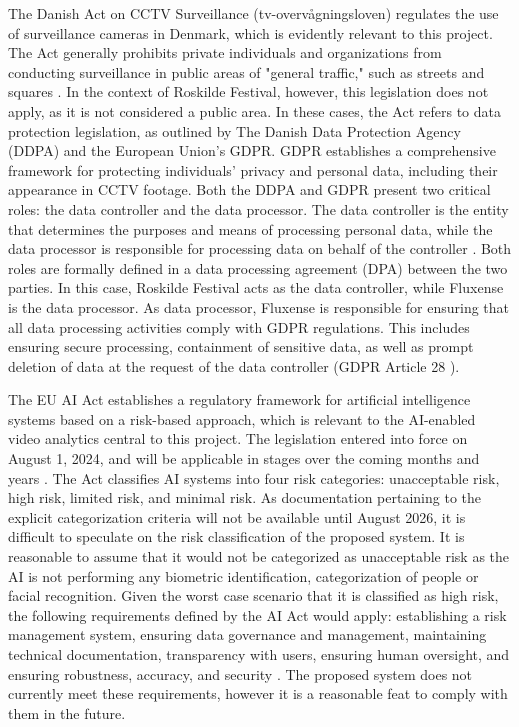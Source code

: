 The Danish Act on CCTV Surveillance (tv-overvågningsloven) regulates the use of surveillance cameras in Denmark, which is evidently relevant to this project. The Act generally prohibits private individuals and organizations from conducting surveillance in public areas of "general traffic," such as streets and squares \cite{cctv_law}. In the context of Roskilde Festival, however, this legislation does not apply, as it is not considered a public area. In these cases, the Act refers to data protection legislation, as outlined by The Danish Data Protection Agency (DDPA) and the European Union's GDPR. GDPR establishes a comprehensive framework for protecting individuals' privacy and personal data, including their appearance in CCTV footage. Both the DDPA and GDPR present two critical roles: the data controller and the data processor. The data controller is the entity that determines the purposes and means of processing personal data, while the data processor is responsible for processing data on behalf of the controller \cite{gdpr_dpa}. Both roles are formally defined in a data processing agreement (DPA) between the two parties. In this case, Roskilde Festival acts as the data controller, while Fluxense is the data processor. As data processor, Fluxense is responsible for ensuring that all data processing activities comply with GDPR regulations. This includes ensuring secure processing, containment of sensitive data, as well as prompt deletion of data at the request of the data controller (GDPR Article 28 \cite{gdpr_article_28}).

The EU AI Act establishes a regulatory framework for artificial intelligence systems based on a risk-based approach, which is relevant to the AI-enabled video analytics central to this project. The legislation entered into force on August 1, 2024, and will be applicable in stages over the coming months and years \cite{ai_act_passed}. The Act classifies AI systems into four risk categories: unacceptable risk, high risk, limited risk, and minimal risk. As documentation pertaining to the explicit categorization criteria will not be available until August 2026, it is difficult to speculate on the risk classification of the proposed system. It is reasonable to assume that it would not be categorized as unacceptable risk as the AI is not performing any biometric identification, categorization of people or facial recognition. Given the worst case scenario that it is classified as high risk, the following requirements defined by the AI Act would apply: establishing a risk management system, ensuring data governance and management, maintaining technical documentation, transparency with users, ensuring human oversight, and ensuring robustness, accuracy, and security \cite{ai_act_requirements}. The proposed system does not currently meet these requirements, however it is a reasonable feat to comply with them in the future.

